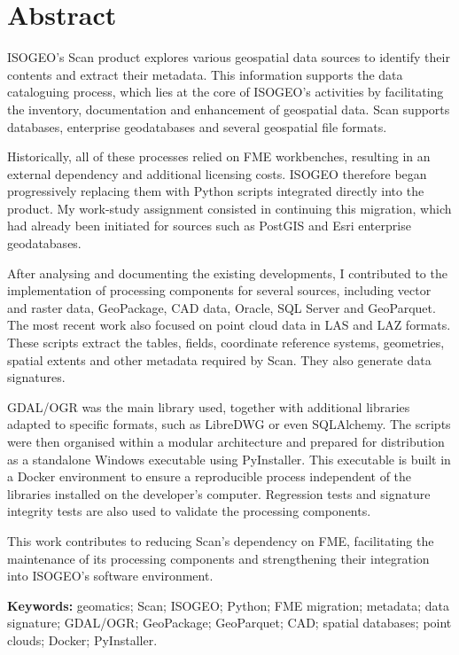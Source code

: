 

\chapter*{Abstract}

ISOGEO's Scan product explores various geospatial data sources to identify
their contents and extract their metadata. This information supports the data
cataloguing process, which lies at the core of ISOGEO's activities by
facilitating the inventory, documentation and enhancement of geospatial data.
Scan supports databases, enterprise geodatabases and several geospatial file
formats.

Historically, all of these processes relied on FME workbenches, resulting in an
external dependency and additional licensing costs. ISOGEO therefore began
progressively replacing them with Python scripts integrated directly into the
product. My work-study assignment consisted in continuing this migration, which
had already been initiated for sources such as PostGIS and Esri enterprise
geodatabases.

After analysing and documenting the existing developments, I contributed to
the implementation of processing components for several sources, including
vector and raster data, GeoPackage, CAD data, Oracle, SQL Server and
GeoParquet. The most recent work also focused on point cloud data in LAS and LAZ
formats. These scripts extract the tables, fields, coordinate reference systems,
geometries, spatial extents and other metadata required by Scan. They also
generate data signatures.

GDAL/OGR was the main library used, together with additional libraries adapted
to specific formats, such as LibreDWG or even SQLAlchemy. The scripts were then
organised within a modular architecture and prepared for distribution as a
standalone Windows executable using PyInstaller. This executable is built in a
Docker environment to ensure a reproducible process independent of the libraries
installed on the developer's computer. Regression tests and signature integrity
tests are also used to validate the processing components.

This work contributes to reducing Scan's dependency on FME, facilitating the
maintenance of its processing components and strengthening their integration
into ISOGEO's software environment.

\vspace{0.7cm}

\noindent
\textbf{Keywords:}
geomatics; Scan; ISOGEO; Python; FME migration; metadata; data signature;
GDAL/OGR; GeoPackage; GeoParquet; CAD; spatial databases; point clouds; Docker;
PyInstaller.
